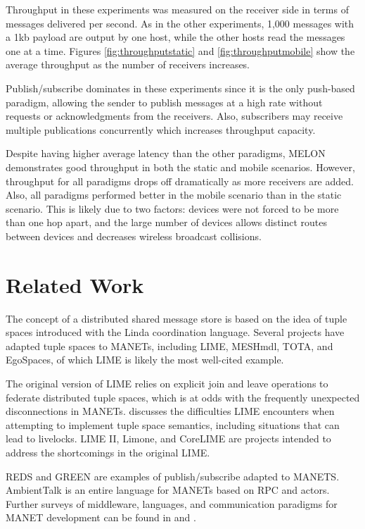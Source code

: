 \documentclass[lnicst]{svmultln}
\begin{document}
Throughput in these experiments was measured on the receiver side in terms of messages delivered per second. As in the other experiments, 1,000 messages with a 1kb payload are output by one host, while the other hosts read the messages one at a time. Figures \ref{fig:throughputstatic} and \ref{fig:throughputmobile} show the average throughput as the number of receivers increases.

Publish/subscribe dominates in these experiments since it is the only push-based paradigm, allowing the sender to publish messages at a high rate without requests or acknowledgments from the receivers. Also, subscribers may receive multiple publications concurrently which increases throughput capacity.

Despite having higher average latency than the other paradigms, MELON demonstrates good throughput in both the static and mobile scenarios. However, throughput for all paradigms drops off dramatically as more receivers are added. Also, all paradigms performed better in the mobile scenario than in the static scenario. This is likely due to two factors: devices were not forced to be more than one hop apart, and the large number of devices allows distinct routes between devices and decreases wireless broadcast collisions.

\section{Related Work}\label{sec:relatedwork}

The concept of a distributed shared message store is based on the idea of tuple spaces introduced with the Linda\cite{linda} coordination language. Several projects have adapted tuple spaces to MANETs, including LIME\cite{lime}, MESHmdl\cite{meshmdl}, TOTA\cite{tota}, and EgoSpaces\cite{egospaces}, of which LIME is likely the most well-cited example.

The original version of LIME relies on explicit join and leave operations to federate distributed tuple spaces, which is at odds with the frequently unexpected disconnections in MANETs. \cite{limerevisted} discusses the difficulties LIME encounters when attempting to implement tuple space semantics, including situations that can lead to livelocks. LIME II\cite{lime2}, Limone\cite{limone}, and CoreLIME\cite{corelime} are projects intended to address the shortcomings in the original LIME.

REDS\cite{reds} and GREEN\cite{green} are examples of publish/subscribe adapted to MANETS. AmbientTalk\cite{ambienttalk} is an entire language for MANETs based on RPC and actors. Further surveys of middleware, languages, and communication paradigms for MANET development can be found in \cite{mine} and \cite{mwtrends}.
\end{document}
